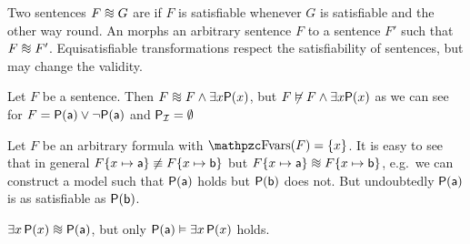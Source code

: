 \begin{definition}\label{def:equisatisfiable}
	Two sentences \( F \equisat G \) are 
	if \( F \) is satisfiable whenever \( G \) is satisfiable
	and the other way round.
	An  morphs an arbitrary sentence
	\( F \) to a sentence \( F' \) such that \( F \equisat F' \).
	Equisatisfiable transformations respect the satisfiability of sentences,
	but may change the validity.
\end{definition}

\begin{example}
	Let \( F \) be a sentence.
	Then \( F \equisat F \land \exists x \mP(x) \),
	but \( F \not\vDash F \land \exists x \mathsf{P}(x) \)
	as we can see for \( F = \mathsf{P}(\mathsf{a})\lor\lnot\mathsf{P}(\mathsf{a}) \)
	and \( \mathsf{P}_{\mathcal{I}} = \emptyset \)
\end{example}




\begin{example}
	Let \(F\) be an arbitrary formula with \( \fvar(F) = \{ x \} \).
	It is easy to see that in general
	\( F\{ x\mapsto\mathsf{a} \} \not\equiv F\{ x\mapsto\mathsf{b} \} \)
	but
	\( F\{ x\mapsto\ma \} \equisat F\{ x\mapsto\mb \} \),
	e.g.~we can construct a model such that
	\(\mathsf{P}(\mathsf{a})\) holds but \(\mathsf{P}(\mathsf{b})\) does not.
	But undoubtedly \(\mathsf{P}(\mathsf{a})\) is as satisfiable as
	 \(\mathsf{P}(\mathsf{b})\).
\end{example}

\begin{example}
	\( \exists x \, \mP(x) \equisat \mP(\ma) \), but only
	\( \mathsf{P}(\mathsf{a}) \vDash \exists x \, \mathsf{P}(x) \) holds.
\end{example}




